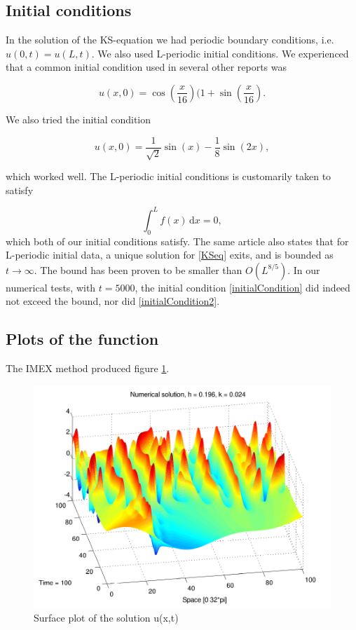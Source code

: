 \subsection*{Initial conditions}
In the solution of the KS-equation we had periodic boundary conditions, i.e. $u(0,t) = u(L,t)$. We also used L-periodic initial conditions. We experienced that a common initial condition used in several other reports was

\begin{equation}
\label{initialCondition}
u(x,0) = \cos(\frac{x}{16})(1 + \sin(\frac{x}{16}).
\end{equation}

We also tried the initial condition

\begin{equation}
\label{initialCondition2}
u(x,0) = \frac{1}{\sqrt{2}} \sin(x) - \frac{1}{8}\sin(2x),
\end{equation}

which worked well. The L-periodic initial conditions is customarily taken \cite{periodicInitial} to satisfy

\begin{equation}
\int_0^L\! f(x)\,\textrm{d}x = 0,
\end{equation}
which both of our initial conditions satisfy. The same article also states that for L-periodic initial data, a unique solution for \eqref{KSeq} exits, and is bounded as $t\rightarrow\infty$. The bound has been proven to be smaller than $O(L^{8/5})$. In our numerical tests, with $t=5000$, the initial condition \eqref{initialCondition} did indeed not exceed the bound, nor did \eqref{initialCondition2}.

\subsection*{Plots of the function}
The IMEX method produced figure \ref{fig:surface}.

\begin{figure}[H]
\centering
\includegraphics[scale=0.7]
{PDFs/IMEX/KS_plot_surface.pdf}
\caption{Surface plot of the solution u(x,t)}
\label{fig:surface}
\end{figure}

